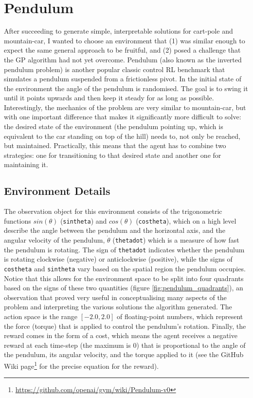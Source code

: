 \chapter{Pendulum}
After succeeding to generate simple, interpretable solutions for cart-pole and mountain-car, I wanted to choose an environment that (1) was similar enough to expect the same general approach to be fruitful, and (2) posed a challenge that the GP algorithm had not yet overcome. Pendulum (also known as the inverted pendulum problem) is another popular classic control RL benchmark that simulates a pendulum suspended from a frictionless pivot. In the initial state of the environment the angle of the pendulum is randomised. The goal is to swing it until it points upwards and then keep it steady for as long as possible. Interestingly, the mechanics of the problem are very similar to mountain-car, but with one important difference that makes it significantly more difficult to solve: the desired state of the environment (the pendulum pointing up, which is equivalent to the car standing on top of the hill) needs to, not only be reached, but maintained. Practically, this means that the agent has to combine two strategies: one for transitioning to that desired state and another one for maintaining it.

\section{Environment Details}
The observation object for this environment consists of the trigonometric functions $sin(\theta)$ (\verb+sintheta+) and $cos(\theta)$ (\verb+costheta+), which on a high level describe the angle between the pendulum and the horizontal axis, and the angular velocity of the pendulum, $\dot\theta$ (\verb+thetadot+) which is a measure of how fast the pendulum is rotating. The sign of \verb+thetadot+ indicates whether the pendulum is rotating clockwise (negative) or anticlockwise (positive), while the signs of \verb+costheta+ and \verb+sintheta+ vary based on the spatial region the pendulum occupies. Notice that this allows for the environment space to be split into four quadrants based on the signs of these two quantities (figure \ref{fig:pendulum_quadrants}), an observation that proved very useful in conceptualising many aspects of the problem and interpreting the various solutions the algorithm generated. The action space is the range $[-2.0, 2.0]$ of floating-point numbers, which represent the force (torque) that is applied to control the pendulum's rotation. Finally, the reward comes in the form of a cost, which means the agent receives a negative reward at each time-step (the maximum is $0$) that is proportional to the angle of the pendulum, its angular velocity, and the torque applied to it (see the GitHub Wiki page\footnote{\url{https://github.com/openai/gym/wiki/Pendulum-v0}} for the precise equation for the reward). 

